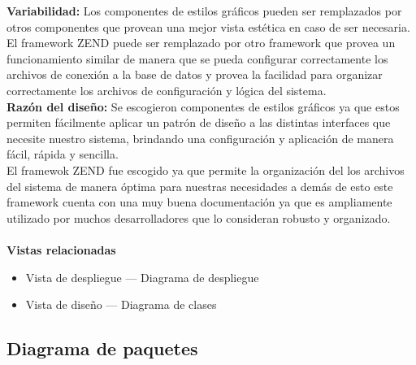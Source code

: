 \documentclass[12pt,oneside,letterpaper]{report}
\begin{document}
\textbf{Variabilidad:}
Los componentes de estilos gráficos pueden ser remplazados por otros componentes que provean una mejor vista estética en caso de ser necesaria.\\
El framework ZEND  puede ser remplazado por otro framework que provea un funcionamiento similar de manera que se pueda configurar correctamente los archivos de conexión a la base de datos y provea la facilidad para organizar correctamente los archivos de configuración y lógica del sistema.\\

\textbf{Razón del diseño:}
Se escogieron componentes de estilos gráficos ya que estos permiten fácilmente aplicar un patrón de diseño a las distintas interfaces que necesite nuestro sistema, brindando una configuración y aplicación de manera fácil, rápida y sencilla.\\
El framewok ZEND fue escogido ya que permite la organización del los archivos del sistema de manera óptima para nuestras necesidades a demás de esto este framework cuenta con una muy buena documentación ya que es ampliamente utilizado por muchos desarrolladores que lo consideran robusto y organizado.\\
\\

\textbf{Vistas relacionadas}
\begin{itemize}
\item Vista de despliegue --- Diagrama de despliegue
\item Vista de diseño --- Diagrama de clases
\end{itemize}

\subsection{Diagrama de paquetes}

\end{document}
